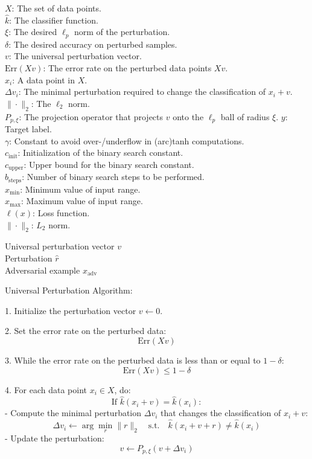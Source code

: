 $X$: The set of data points.\\
$\hat{k}$: The classifier function.\\
$\xi$: The desired $\ell_p$ norm of the perturbation.\\
$\delta$: The desired accuracy on perturbed samples.\\
$v$: The universal perturbation vector.\\
$\text{Err}(Xv)$: The error rate on the perturbed data points $Xv$.\\
$x_i$: A data point in $X$.\\
$\Delta v_i$: The minimal perturbation required to change the classification of $x_i + v$.\\
$\| \cdot \|_2$: The $\ell_2$ norm.\\
$P_{p, \xi}$: The projection operator that projects $v$ onto the $\ell_p$ ball of radius $\xi$.
$y$: Target label.\\
$\gamma$: Constant to avoid over-/underflow in (arc)tanh computations.\\
$c_{\text{init}}$: Initialization of the binary search constant.\\
$c_{\text{upper}}$: Upper bound for the binary search constant.\\
$b_{\text{steps}}$: Number of binary search steps to be performed.\\
$x_{\text{min}}$: Minimum value of input range.\\
$x_{\text{max}}$: Maximum value of input range.\\
$\ell(x)$: Loss function.\\
$\| \cdot \|_2$: $L_2$ norm.

Universal perturbation vector $v$\\
Perturbation $\hat{r}$\\
Adversarial example $x_{\text{adv}}$


Universal Perturbation Algorithm:

1. Initialize the perturbation vector $v \leftarrow 0$.

2. Set the error rate on the perturbed data:
\[
\text{Err}(Xv)
\]

3. While the error rate on the perturbed data is less than or equal to $1 - \delta$:
\[
\text{Err}(Xv) \leq 1 - \delta
\]

4. For each data point $x_i \in X$, do:
\[
\text{If } \hat{k}(x_i + v) = \hat{k}(x_i):
\]
    - Compute the minimal perturbation $\Delta v_i$ that changes the classification of $x_i + v$:
    \[
    \Delta v_i \leftarrow \arg \min_{r} \|r\|_2 \quad \text{s.t.} \quad \hat{k}(x_i + v + r) \neq \hat{k}(x_i)
    \]
    - Update the perturbation:
    \[
    v \leftarrow P_{p, \xi}(v + \Delta v_i)
    \]

